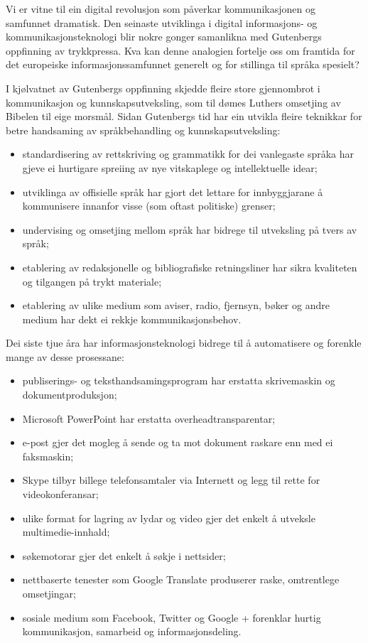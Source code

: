 \begin{multicols}{2}

Vi er vitne til ein digital revolusjon som påverkar kommunikasjonen og samfunnet dramatisk. Den seinaste utviklinga i digital informasjons- og kommunikasjonsteknologi blir nokre gonger samanlikna med Gutenbergs oppfinning av trykkpressa. Kva kan denne analogien fortelje oss om framtida for det europeiske informasjonssamfunnet generelt og for stillinga til språka spesielt? 


I kjølvatnet av Gutenbergs oppfinning skjedde fleire store gjennombrot i kommunikasjon og kunnskapsutveksling, som til dømes Luthers omsetjing av Bibelen til eige morsmål. Sidan Gutenbergs tid har ein utvikla fleire teknikkar for betre handsaming av språkbehandling og kunnskapsutveksling: 

\begin{itemize}
\item standardisering av rettskriving og grammatikk for dei vanlegaste språka har gjeve ei hurtigare spreiing av nye vitskaplege og intellektuelle idear;
\item utviklinga av offisielle språk har gjort det lettare for innbyggjarane å kommunisere innanfor visse (som oftast politiske) grenser; 
\item undervising og omsetjing mellom språk har bidrege til utveksling på tvers av språk; 
\item  etablering av redaksjonelle og bibliografiske retningsliner har sikra kvaliteten og tilgangen på trykt materiale; 
\item etablering av ulike medium som aviser, radio, fjernsyn, bøker og andre medium har dekt ei rekkje kommunikasjonsbehov. 
\end{itemize}

Dei siste tjue åra har informasjonsteknologi bidrege til å automatisere og forenkle mange av desse prosessane: 

\begin{itemize}
\item publiserings- og teksthandsamingsprogram har erstatta skrivemaskin og dokumentproduksjon; 
\item Microsoft PowerPoint har erstatta overheadtransparentar; 
\item e-post gjer det mogleg å sende og ta mot dokument raskare enn med ei faksmaskin; 
\item Skype tilbyr billege telefonsamtaler via Internett og legg til rette for videokonferansar; 
\item ulike format for lagring av lydar og video gjer det enkelt å utveksle multimedie-innhald; 
\item søkemotorar gjer det enkelt å søkje i nettsider; 
\item nettbaserte tenester som Google Translate produserer raske, omtrentlege omsetjingar; 
\item sosiale medium som Facebook, Twitter og Google + forenklar hurtig kommunikasjon, samarbeid og informasjonsdeling. 
\end{itemize}


\end{multicols}
